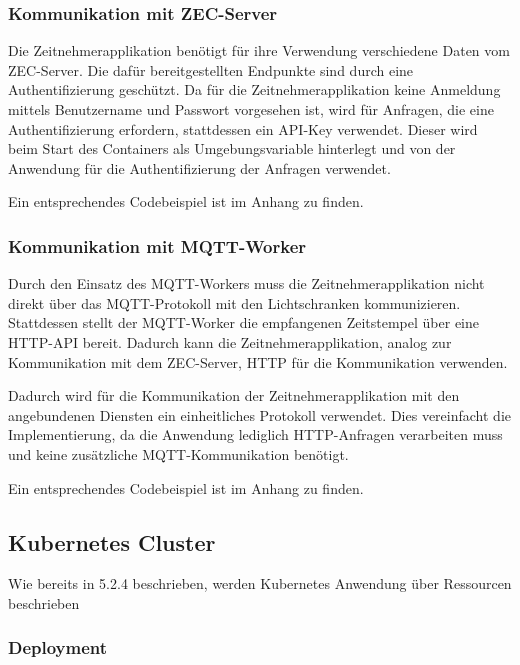 \newpage

\subsubsection{Kommunikation mit ZEC-Server}

Die Zeitnehmerapplikation benötigt für ihre Verwendung verschiedene Daten vom ZEC-Server. Die dafür bereitgestellten Endpunkte sind durch eine Authentifizierung geschützt. Da für die Zeitnehmerapplikation keine Anmeldung mittels Benutzername und Passwort vorgesehen ist, wird für Anfragen, die eine Authentifizierung erfordern, stattdessen ein API-Key verwendet. Dieser wird beim Start des Containers als Umgebungsvariable hinterlegt und von der Anwendung für die Authentifizierung der Anfragen verwendet.

Ein entsprechendes Codebeispiel ist im Anhang zu finden.

\subsubsection{Kommunikation mit MQTT-Worker}

Durch den Einsatz des MQTT-Workers muss die Zeitnehmerapplikation nicht direkt über das MQTT-Protokoll mit den Lichtschranken kommunizieren. Stattdessen stellt der MQTT-Worker die empfangenen Zeitstempel über eine HTTP-\gls{API} bereit. Dadurch kann die Zeitnehmerapplikation, analog zur Kommunikation mit dem ZEC-Server, HTTP für die Kommunikation verwenden.

Dadurch wird für die Kommunikation der Zeitnehmerapplikation mit den angebundenen Diensten ein einheitliches Protokoll verwendet. Dies vereinfacht die Implementierung, da die Anwendung lediglich HTTP-Anfragen verarbeiten muss und keine zusätzliche MQTT-Kommunikation benötigt.

Ein entsprechendes Codebeispiel ist im Anhang zu finden.

\newpage

\subsection{Kubernetes Cluster}

Wie bereits in 5.2.4 beschrieben, werden Kubernetes Anwendung über Ressourcen beschrieben

\subsubsection{Deployment}

